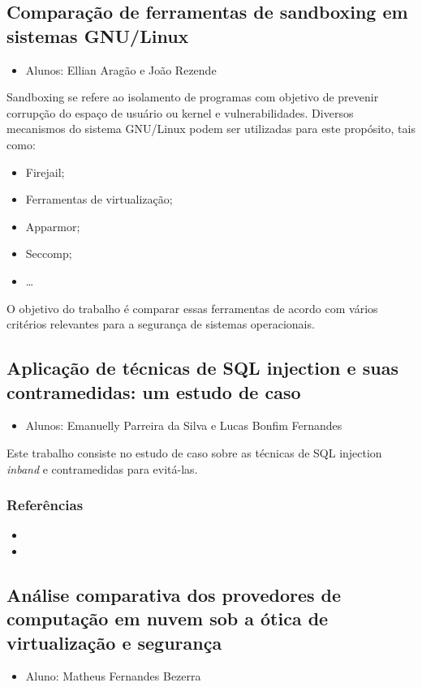 \documentclass{article}
\newcommand*{\nsubsection}[1]{
    \subsection{#1}
}
\begin{document}
\nsubsection{Comparação de ferramentas de sandboxing em sistemas GNU/Linux}

\begin{itemize}
	\item Alunos: Ellian Aragão e João Rezende
\end{itemize}
Sandboxing se refere ao isolamento de programas com objetivo de prevenir corrupção do espaço de usuário ou kernel e vulnerabilidades. Diversos mecanismos do sistema GNU/Linux podem ser utilizadas para este propósito, tais como: 
\begin{itemize}
	\item Firejail;
	\item Ferramentas de virtualização;
	\item Apparmor;
	\item Seccomp;
	\item \ldots
\end{itemize}



O objetivo do trabalho é comparar essas ferramentas de acordo com vários critérios relevantes para a segurança de sistemas operacionais.

\nsubsection{Aplicação de técnicas de SQL injection e suas contramedidas: um estudo de caso}

\begin{itemize}
	\item Alunos: Emanuelly Parreira da Silva e Lucas Bonfim Fernandes
\end{itemize}


Este trabalho consiste no estudo de caso sobre as técnicas de SQL injection {\it inband} e contramedidas para evitá-las. 



\subsubsection*{Referências}
\begin{itemize}
	\item {}	
	\item {}
\end{itemize}

\nsubsection{Análise comparativa dos provedores de computação em nuvem sob a ótica de virtualização e segurança}

\begin{itemize}
	\item Aluno: Matheus Fernandes Bezerra
\end{itemize}
\end{document}
